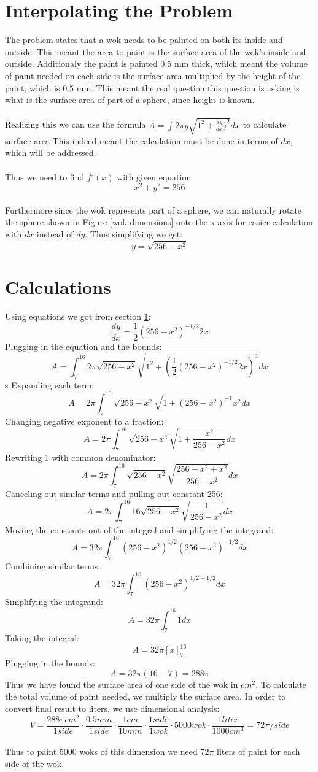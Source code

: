\documentclass[a4paper, 12pt]{article}
\begin{document}
	\section{Interpolating the Problem}
		\label{interpolation}
		The problem states that a wok needs to be painted on both its inside and outside. This meant the area to paint is the surface area of the wok's inside and outside. Additionaly the paint is painted 0.5 mm thick, which meant the volume of paint needed on each side is the surface area multiplied by the height of the paint, which is 0.5 mm. This meant the  real question this question is asking is what is the surface area of part of a sphere, since height is known.\\\\
		Realizing this we can use the formula $A = \int2\pi y\sqrt{1^2+\frac{dy}{dx})^2}dx$ to calculate surface area This indeed meant the calculation must be done in terms of $dx$, which will be addressed.\\\\
		 Thus we need to find $f'(x)$ with given equation $$x^2+y^2=256$$\\
		Furthermore since the wok represents part of a sphere, we can naturally rotate the sphere shown in Figure \ref{wok dimensions} onto the x-axis for easier calculation with $dx$ instead of $dy$. Thus simplifying we get:$$y=\sqrt{256-x^2}$$

	\section{Calculations} 
		Using equations we got from section \ref{interpolation}: $$\frac{dy}{dx}=\frac{1}{2}{(256-x^2)}^{-1/2} 2x$$
		Plugging in the equation and the bounds:$$A = \int_7^{16} 2\pi \sqrt{256-x^2}\sqrt{1^2+{(\frac{1}{2}{(256-x^2)}^{-1/2} 2x)}^2}dx$$s
		Expanding each term:$$A =2\pi \int_7^{16} \sqrt{256-x^2}\sqrt{1+{(256-x^2)}^{-1} x^2}dx$$
		Changing negative exponent to a fraction:$$A =2\pi \int_7^{16} \sqrt{256-x^2}\sqrt{1+\frac{x^2}{256-x^2}}dx$$
		Rewriting 1 with common denominator:$$A =2\pi \int_7^{16} \sqrt{256-x^2}\sqrt{\frac{256-x^2+x^2}{256-x^2}}dx$$
		Canceling out similar terms and pulling out constant 256:$$A =2\pi \int_7^{16} 16\sqrt{256-x^2} \sqrt{\frac{1}{256-x^2}}dx$$
		Moving the constants out of the integral and simplifying the integrand:$$A =32\pi \int_7^{16}{(256-x^2)}^{1/2} {(256-x^2)}^{-1/2}dx$$
		Combining similar terms:$$A =32\pi \int_7^{16}{(256-x^2)}^{1/2-1/2} dx$$
		Simplifying the integrand:$$A =32\pi \int_7^{16}1 dx$$
		Taking the integral:$$A =32\pi \left[x\right]_7^{16}$$
		Plugging in the bounds:$$A =32\pi {(16-7)}=288\pi$$
		Thus we have found the surface area of one side of the wok in $cm^2$. To calculate the total volume of paint needed, we multiply the surface area. In order to convert final result to liters, we use dimensional analysis:$$V=\frac{288\pi cm^2}{1 side}\cdot\frac{ 0.5 mm}{1 side} \cdot\frac{1 cm}{10 mm}\cdot\frac{1 side}{1 wok}\cdot5000 wok\cdot\frac{1 liter}{1000cm^3}=72\pi/side$$\\
		Thus to paint 5000 woks of this dimension we need $72\pi$ liters of paint for each side of the wok.
\end{document}
